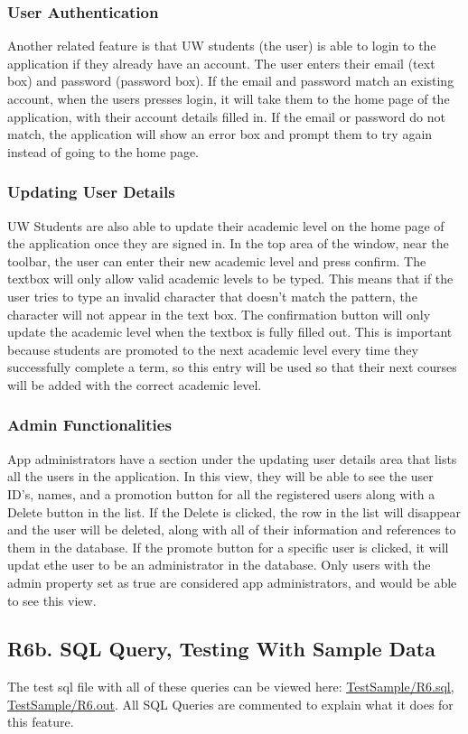 \documentclass[12pt, a4paper]{article}
\begin{document}
\subsubsection*{User Authentication}
Another related feature is that UW students (the user) is able to login to the application if they already have an account. The user enters their email (text box) and password (password box). If the email and password match an existing account, when the users presses login, it will take them to the home page of the application, with their account details filled in. If the email or password do not match, the application will show an error box and prompt them to try again instead of going to the home page.
\subsubsection*{Updating User Details}
UW Students are also able to update their academic level on the home page of the application once they are signed in. In the top area of the window, near the toolbar, the user can enter their new academic level and press confirm. The textbox will only allow valid academic levels to be typed. This means that if the user tries to type an invalid character that doesn't match the pattern, the character will not appear in the text box. The confirmation button will only update the academic level when the textbox is fully filled out. This is important because students are promoted to the next academic level every time they successfully complete a term, so this entry will be used so that their next courses will be added with the correct academic level.
\subsubsection*{Admin Functionalities}
App administrators have a section under the updating user details area that lists all the users in the application. In this view, they will be able to see the user ID's, names, and a promotion button for all the registered users along with a Delete button in the list. If the Delete is clicked, the row in the list will disappear and the user will be deleted, along with all of their information and references to them in the database. If the promote button for a specific user is clicked, it will updat ethe user to be an administrator in the database. Only users with the admin property set as true are considered app administrators, and would be able to see this view.
\subsection*{R6b. SQL Query, Testing With Sample Data}
The test sql file with all of these queries can be viewed here: \underline{\href{https://github.com/Kggupta/DegreeMap/tree/main/Database/Queries/TestSample}{TestSample/R6.sql}}, \underline{\href{https://github.com/Kggupta/DegreeMap/tree/main/Database/Queries/TestSample}{TestSample/R6.out}}. All SQL Queries are commented to explain what it does for this feature.
\end{document}
